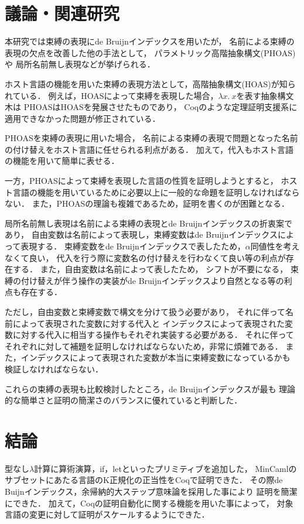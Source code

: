 \documentclass[T]{compsoft}
\begin{document}
\section{議論・関連研究}
本研究では束縛の表現にde Bruijnインデックスを用いたが，
名前による束縛の表現の欠点を改善した他の手法として，
パラメトリック高階抽象構文(PHOAS)\cite{Chlipala:2008:PHA:1411204.1411226}や
局所名前無し表現\cite{chargueraud-11-ln}などが挙げられる．

ホスト言語の機能を用いた束縛の表現方法として，高階抽象構文(HOAS)が知られている．
例えば，HOASによって束縛を表現した場合，$\lambda x.~x$を表す抽象構文木は
PHOASはHOASを発展させたものであり，
Coqのような定理証明支援系に適用できなかった問題が修正されている．

PHOASを束縛の表現に用いた場合，
名前による束縛の表現で問題となった名前の付け替えをホスト言語に任せられる利点がある．
加えて，代入もホスト言語の機能を用いて簡単に表せる．

一方，PHOASによって束縛を表現した言語の性質を証明しようとすると，
ホスト言語の機能を用いているために必要以上に一般的な命題を証明しなければならない．
また，PHOASの理論も複雑であるため，証明を書くのが困難となる．

局所名前無し表現は名前による束縛の表現とde Bruijnインデックスの折衷案であり，
自由変数は名前によって表現し，束縛変数はde Bruijnインデックスによって表現する．
束縛変数をde Bruijnインデックスで表したため，$\alpha$同値性を考えなくて良い，
代入を行う際に変数名の付け替えを行わなくて良い等の利点が存在する．
また，自由変数は名前によって表したため，
シフトが不要になる，
束縛の付け替えが伴う操作の実装がde Bruijnインデックスより自然となる等の利点も存在する．

ただし，自由変数と束縛変数で構文を分けて扱う必要があり，
それに伴って名前によって表現された変数に対する代入と
インデックスによって表現された変数に対する代入に相当する操作もそれぞれ実装する必要がある．
それに伴ってそれぞれに対して補題を証明しなければならないため，非常に煩雑である．
また，インデックスによって表現された変数が本当に束縛変数になっているかも
検証しなければならない．

これらの束縛の表現も比較検討したところ，de Bruijnインデックスが最も
理論的な簡単さと証明の簡潔さのバランスに優れていると判断した．

\section{結論}
型なし$\lambda$計算に算術演算，if，letといったプリミティブを追加した，
MinCamlのサブセットにあたる言語のK正規化の正当性をCoqで証明できた．
その際de Buijnインデックス，余帰納的大ステップ意味論を採用した事により
証明を簡潔にできた．
加えて，Coqの証明自動化に関する機能を用いた事によって，
対象言語の変更に対して証明がスケールするようにできた．
\end{document}

